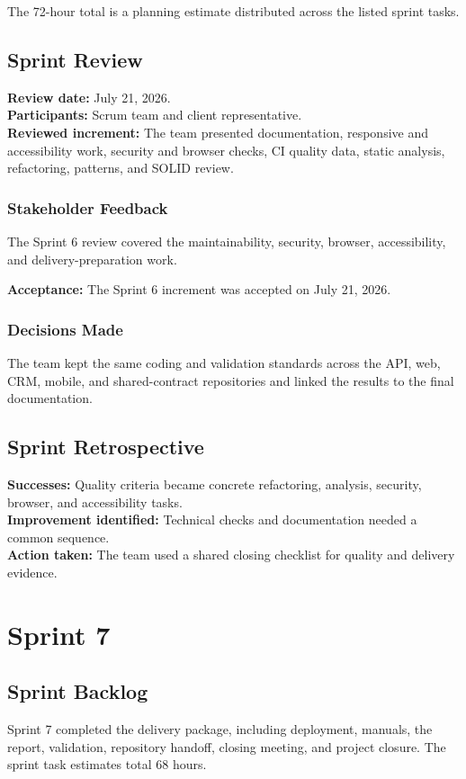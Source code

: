 \documentclass[letterpaper%
, oneside%
, 12pt%
, memoireprojet%
, english%
,creativecommons,hyperref, withAlgo2e %
]{thETS}
\begin{document}
The 72-hour total is a planning estimate distributed across the listed sprint tasks.

\subsection{Sprint Review}
\textbf{Review date:} July 21, 2026.\\
\textbf{Participants:} Scrum team and client representative.\\
\textbf{Reviewed increment:} The team presented documentation, responsive and accessibility work,
security and browser checks, CI quality data, static analysis, refactoring, patterns, and SOLID review.

\subsubsection{Stakeholder Feedback}
The Sprint 6 review covered the maintainability, security, browser, accessibility, and
delivery-preparation work.

\textbf{Acceptance:} The Sprint 6 increment was accepted on July 21, 2026.

\subsubsection{Decisions Made}
The team kept the same coding and validation standards across the API, web, CRM, mobile, and
shared-contract repositories and linked the results to the final documentation.

\subsection{Sprint Retrospective}
\textbf{Successes:} Quality criteria became concrete refactoring, analysis, security, browser, and accessibility tasks.\\
\textbf{Improvement identified:} Technical checks and documentation needed a common sequence.\\
\textbf{Action taken:} The team used a shared closing checklist for quality and delivery evidence.

\section{Sprint 7}
\subsection{Sprint Backlog}
Sprint 7 completed the delivery package, including deployment, manuals, the report, validation,
repository handoff, closing meeting, and project closure. The sprint task estimates total 68 hours.
\end{document}
